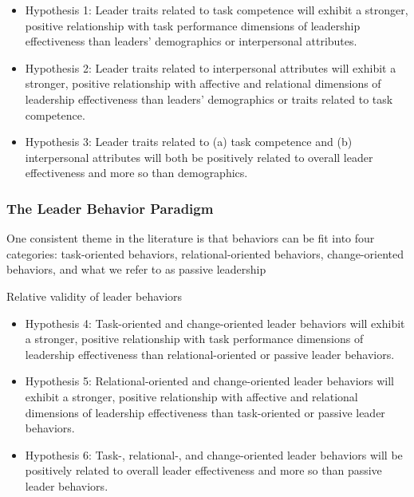 \begin{itemize}
	\item Hypothesis 1: Leader traits related to task competence will exhibit a stronger, positive relationship with task performance dimensions of leadership effectiveness than leaders’ demographics or interpersonal attributes.
	\item Hypothesis 2: Leader traits related to interpersonal attributes will exhibit a stronger, positive relationship with affective and relational dimensions of leadership effectiveness than leaders’ demographics or traits related to task competence.
	\item Hypothesis 3: Leader traits related to (a) task competence and (b) interpersonal attributes will both be positively related to overall leader effectiveness and more so than demographics.
\end{itemize}

\subsubsection{The Leader Behavior Paradigm} %
\label{ssub:the_leader_behavior_paradigm}
One consistent theme in the literature is that behaviors can be fit into four categories: task-oriented behaviors, relational-oriented behaviors, change-oriented behaviors, and what we refer to as passive leadership

Relative validity of leader behaviors
\begin{itemize}
	\item Hypothesis 4: Task-oriented and change-oriented leader behaviors will exhibit a stronger, positive relationship with task performance dimensions of leadership effectiveness than relational-oriented or passive leader behaviors.
	\item Hypothesis 5: Relational-oriented and change-oriented leader behaviors will exhibit a stronger, positive relationship with affective and relational dimensions of leadership effectiveness than task-oriented or passive leader behaviors.
	\item Hypothesis 6: Task-, relational-, and change-oriented leader behaviors will be positively related to overall leader effectiveness and more so than passive leader behaviors.
\end{itemize}


